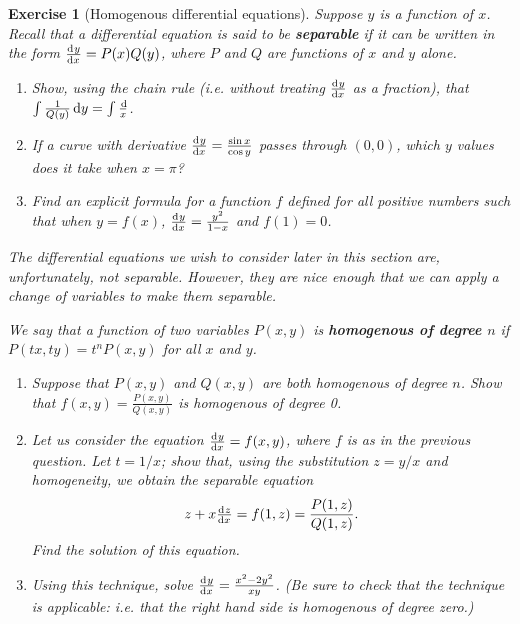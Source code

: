 \documentclass[a4paper,leqno,9pt]{article}
\theoremstyle{exercise}
\newtheorem{exercise}{Exercise}
\theoremstyle{plain}
\theoremstyle{definition}
\theoremstyle{remark}
\newcommand{\df}[1]{\textbf{#1}}
\begin{document}
\begin{exercise}[Homogenous differential equations]
  Suppose $ y $ is a function of $ x $. Recall that a differential equation is said to be \df{separable} if it can
  be written in the form $ \od{y}{x} = P(x) Q(y) $, where $ P $ and $ Q $ are functions of $ x $ and $ y $ alone.
  \begin{enumerate}
    \item Show, using the chain rule (i.e. without treating $ \od{y}{x} $ as a fraction), that $ \int \frac{1}{Q(y)} \dif{y} = \int \frac \dif{x} $.
    \item If a curve with derivative $ \od{y}{x} = \frac{\sin x}{\cos y} $ passes through $ (0,0) $, which $ y $ values does it take when $ x = \pi $?
    \item Find an explicit formula for a function $ f $ defined for all positive numbers such that when $ y = f(x) $,
          $ \od{y}{x} = \frac{y^2}{1 - x} $ and $ f(1) = 0 $.
  \end{enumerate}

  The differential equations we wish to consider later in this section are, unfortunately, \emph{not} separable. However,
  they are nice enough that we can apply a change of variables to \emph{make} them separable.

  We say that a function of two variables $ P(x,y) $ is \df{homogenous of degree $ n $} if $ P(tx, ty) = t^nP(x,y) $ for all $ x $ and $ y $.
  \begin{enumerate}[resume]
    \item Suppose that $ P(x,y) $ and $ Q(x,y) $ are both homogenous of degree $ n $. Show that $ f(x,y) = \frac{P(x,y)}{Q(x,y)} $ is
          homogenous of degree 0.
    \item Let us consider the equation $ \od{y}{x} = f(x,y) $, where $ f $ is as in the previous question. Let $ t = 1/x $;
          show that, using the substitution $ z = y/x $ and homogeneity, we obtain the separable equation
          \begin{displaymath}
            z + x\od{z}{x} = f(1,z) = \frac{P(1,z)}{Q(1,z)}.
          \end{displaymath}
          Find the solution of this equation.
    \item Using this technique, solve $ \od{y}{x} = \frac{x^2 - 2y^2}{xy} $. (Be sure to check that the technique is applicable: i.e. that
          the right hand side is homogenous of degree zero.)
  \end{enumerate}
\end{exercise}
\end{document}

